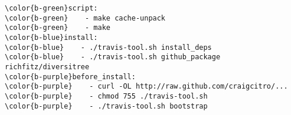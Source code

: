 \documentclass[class=minimal,border=0]{standalone}
\begin{document}
%
\begin{BVerbatim}[bgcolor=b-darkgrey]
\color{b-green}script:
\color{b-green}    - make cache-unpack
\color{b-green}    - make
\color{b-blue}install:
\color{b-blue}    - ./travis-tool.sh install_deps
\color{b-blue}    - ./travis-tool.sh github_package richfitz/diversitree
\color{b-purple}before_install:
\color{b-purple}    - curl -OL http://raw.github.com/craigcitro/...
\color{b-purple}    - chmod 755 ./travis-tool.sh
\color{b-purple}    - ./travis-tool.sh bootstrap
\end{BVerbatim}
\end{document}
